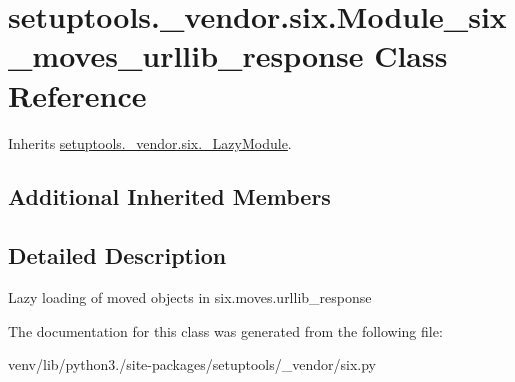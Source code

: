 \hypertarget{classsetuptools_1_1__vendor_1_1six_1_1_module__six__moves__urllib__response}{}\section{setuptools.\+\_\+vendor.\+six.\+Module\+\_\+six\+\_\+moves\+\_\+urllib\+\_\+response Class Reference}
\label{classsetuptools_1_1__vendor_1_1six_1_1_module__six__moves__urllib__response}


Inherits \hyperlink{classsetuptools_1_1__vendor_1_1six_1_1___lazy_module}{setuptools.\+\_\+vendor.\+six.\+\_\+\+Lazy\+Module}.

\subsection*{Additional Inherited Members}


\subsection{Detailed Description}
\begin{DoxyVerb}Lazy loading of moved objects in six.moves.urllib_response\end{DoxyVerb}
 

The documentation for this class was generated from the following file\+:\begin{DoxyCompactItemize}
\item 
venv/lib/python3./site-\/packages/setuptools/\+\_\+vendor/six.\+py\end{DoxyCompactItemize}
